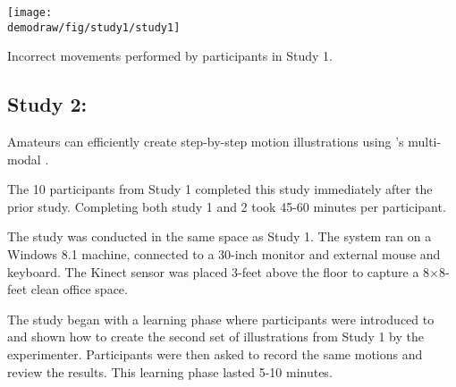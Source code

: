 \begin{table}
  \centering
  \texttt{[image: \\demodraw/fig/study1/study1]}
  \caption{Incorrect movements performed by participants in Study 1.}
  \label{tab:study1_errors}
\end{table}


\subsection{Study 2: \phaseI{}}

Amateurs can efficiently create step-by-step motion illustrations using \systemname{}'s multi-modal \phaseI{}.

The 10 participants from Study 1 completed this study immediately after the prior study.
Completing both study 1 and 2 took 45-60 minutes per participant.

The study was conducted in the same space as Study 1. The \systemname{} system ran  on a Windows 8.1 machine, connected to a 30-inch monitor and external mouse and keyboard. The Kinect sensor was placed 3-feet above the floor to capture a 8$\times$8-feet clean office space.

The study began with a learning phase where participants were introduced to \systemname{} and shown how to create the second set of illustrations from Study 1 by the experimenter.
Participants were then asked to record the same motions and review the results. This learning phase lasted 5-10 minutes.

